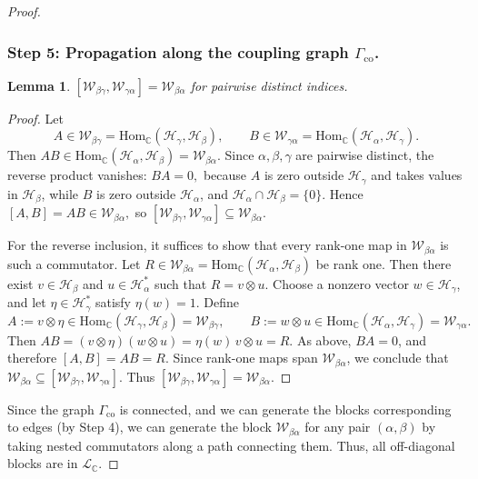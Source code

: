 \documentclass[11pt,letterpaper]{article}
\theoremstyle{plain}
\theoremstyle{plain}
\theoremstyle{plain}
\theoremstyle{plain}
\theoremstyle{plain}
\theoremstyle{plain}
\newcommand{\C}{\mathbb{C}}
\newcommand{\Hom}{\mathrm{Hom}}
\newcommand{\HH}{\mathcal{H}}
\theoremstyle{plain}
\newtheorem{smlemma}[smtheorem]{Lemma}
\theoremstyle{definition}
\theoremstyle{plain}
\begin{document}
\begin{proof}
\subsubsection*{Step 5: Propagation along the coupling graph $\Gamma_{\mathrm{co}}$.}

\begin{smlemma}
    $[\mathcal{W}_{\beta\gamma}, \mathcal{W}_{\gamma\alpha}] = \mathcal{W}_{\beta\alpha}$ for pairwise distinct indices.
\end{smlemma}
\begin{proof}
Let
\[
A\in \mathcal W_{\beta\gamma}=\Hom_\C(\HH_\gamma,\HH_\beta),
\qquad
B\in \mathcal W_{\gamma\alpha}=\Hom_\C(\HH_\alpha,\HH_\gamma).
\]
Then
$
AB\in \Hom_\C(\HH_\alpha,\HH_\beta)=\mathcal W_{\beta\alpha}.
$
Since \(\alpha,\beta,\gamma\) are pairwise distinct, the reverse product vanishes:
$
BA=0,
$
because \(A\) is zero outside \(\HH_\gamma\) and takes values in \(\HH_\beta\), while \(B\) is zero outside \(\HH_\alpha\), 
and \(\HH_\alpha\cap \HH_\beta=\{0\}\).
Hence
$
[A,B]=AB\in \mathcal W_{\beta\alpha},
$
so
$
[\mathcal W_{\beta\gamma},\mathcal W_{\gamma\alpha}]
\subseteq
\mathcal W_{\beta\alpha}.
$

For the reverse inclusion, it suffices to show that every rank-one map in
\(\mathcal W_{\beta\alpha}\) is such a commutator. Let
$
R\in \mathcal W_{\beta\alpha}=\Hom_\C(\HH_\alpha,\HH_\beta)
$
be rank one. Then there exist \(v\in \HH_\beta\) and \(u\in \HH_\alpha^*\) such that
$
R=v\otimes u.
$
Choose a nonzero vector \(w\in \HH_\gamma\), and let \(\eta\in \HH_\gamma^*\) satisfy
\(\eta(w)=1\). Define
\[
A:=v\otimes \eta \in \Hom_\C(\HH_\gamma,\HH_\beta)=\mathcal W_{\beta\gamma},
\qquad
B:=w\otimes u \in \Hom_\C(\HH_\alpha,\HH_\gamma)=\mathcal W_{\gamma\alpha}.
\]
Then
$
AB=(v\otimes \eta)(w\otimes u)=\eta(w)\,v\otimes u=R.
$
As above, \(BA=0\), and therefore
$
[A,B]=AB=R.
$
Since rank-one maps span \(\mathcal W_{\beta\alpha}\), we conclude that
$
\mathcal W_{\beta\alpha}\subseteq
[\mathcal W_{\beta\gamma},\mathcal W_{\gamma\alpha}].
$
Thus
$
[\mathcal W_{\beta\gamma},\mathcal W_{\gamma\alpha}]=\mathcal W_{\beta\alpha}.
$
\end{proof}

Since the graph $\Gamma_{\mathrm{co}}$ is connected, and we can generate the blocks corresponding to edges (by Step 4),
we can generate the block $\mathcal{W}_{\beta\alpha}$ for any pair $(\alpha, \beta)$ by taking nested commutators along a path connecting them. 
Thus, all off-diagonal blocks are in $\mathcal{L}_\C$.


\end{proof}
\end{document}
